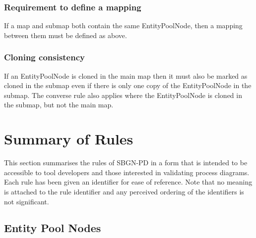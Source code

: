 \subsubsection{Requirement to define a mapping}

If a map and submap both contain the same EntityPoolNode, then a
mapping between them must be defined as above.

\subsubsection{Cloning consistency}

If an EntityPoolNode is cloned in the main map then it must also be
marked as cloned in the submap even if there is only one copy of the
EntityPoolNode in the submap. The converse rule also applies where the
EntityPoolNode is cloned in the submap, but not the main map.

\section{Summary of Rules}

This section summarises the rules of SBGN-PD in a form that is intended to be accessible to tool developers and those interested in validating process diagrams. Each rule has been given an identifier for ease of reference. Note that no meaning is attached to the rule identifier and any perceived ordering of the identifiers is not significant.

\subsection{Entity Pool Nodes}

